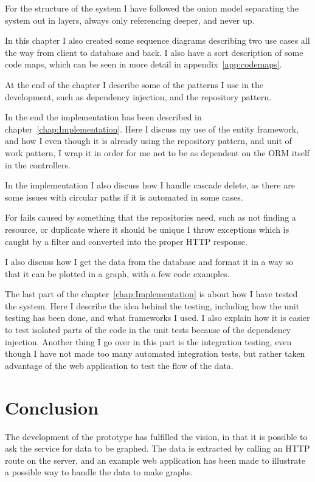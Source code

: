 For the structure of the system I have followed the onion model separating the
system out in layers, always only referencing deeper, and never up.

In this chapter I also created some sequence diagrams describing two use cases
all the way from client to database and back. I also have a sort description of
some code maps, which can be seen in more detail in appendix~\ref{app:codemaps}.

At the end of the chapter I describe some of the patterns I use in the
development, such as dependency injection, and the repository pattern.

In the end the implementation has been described in
chapter~\ref{chap:Implementation}. Here I discuss my use of the entity
framework, and how I even though it is already using the repository pattern, and
unit of work pattern, I wrap it in order for me not to be as dependent on the
ORM itself in the controllers.

In the implementation I also discuss how I handle cascade delete, as there are
some issues with circular paths if it is automated in some cases.

For fails caused by something that the repositories need, such as not finding a
resource, or duplicate where it should be unique I throw exceptions which is caught by a filter
and converted into the proper HTTP response.

I also discuss how I get the data from the database and format it in a way so
that it can be plotted in a graph, with a few code examples.

The last part of the chapter~\ref{chap:Implementation} is about how I have
tested the system. Here I describe the idea behind the testing, including how
the unit testing has been done, and what frameworks I used. I also explain how
it is easier to test isolated parts of the code in the unit tests because of the
dependency injection. Another thing I go over in this part is the integration
testing, even though I have not made too many automated integration tests, but
rather taken advantage of the web application to test the flow of the data.

\section{Conclusion}
The development of the prototype has fulfilled the vision, in that it is
possible to ask the service for data to be graphed. The data is extracted by
calling an HTTP route on the server, and an example web application has been
made to illustrate a possible way to handle the data to make graphs.

